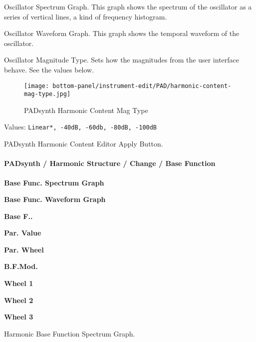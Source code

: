    Oscillator Spectrum Graph.
   This graph shows the spectrum of the oscillator as a series of vertical
   lines, a kind of frequency histogram.

   Oscillator Waveform Graph.
   This graph shows the temporal waveform  of the oscillator.

   Oscillator Magnitude Type.
   Sets how the magnitudes from the user interface behave.  See the values
   below.

\begin{figure}[H]
   \centering
   \texttt{[image: bottom-panel/instrument-edit/PAD/harmonic-content-mag-type.jpg]}
   \caption{PADsynth Harmonic Content Mag Type}
   \label{fig:padsynth_harmonic_content_mag_type}
\end{figure}

   Values: \texttt{Linear*, -40dB, -60db, -80dB, -100dB}

   PADsynth Harmonic Content Editor Apply Button.

\paragraph{PADsynth / Harmonic Structure / Change / Base Function}
\label{paragraph:padsynth_harmonic_structure_change_base_function}

   \begin{enumber}
      \item \textbf{Base Func. Spectrum Graph}
      \item \textbf{Base Func. Waveform Graph}
      \item \textbf{Base F..}
      \item \textbf{Par. Value}
      \item \textbf{Par. Wheel}
      \item \textbf{B.F.Mod.}
      \item \textbf{Wheel 1}
      \item \textbf{Wheel 2}
      \item \textbf{Wheel 3}
   \end{enumber}

   \setcounter{ItemCounter}{0}      %

   Harmonic Base Function Spectrum Graph.

